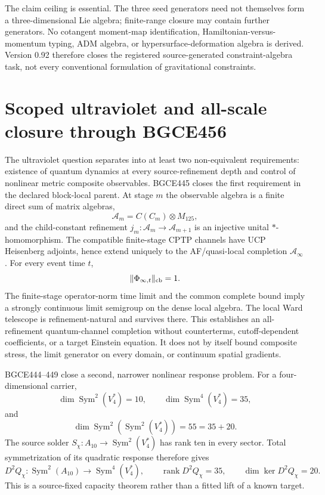 \documentclass[11pt]{article}
\theoremstyle{definition}
\theoremstyle{remark}
\newcommand{\Sym}{\operatorname{Sym}}
\begin{document}
The claim ceiling is essential. The three seed generators need not themselves form a three-dimensional Lie algebra; finite-range closure may contain further generators. No cotangent moment-map identification, Hamiltonian-versus-momentum typing, ADM algebra, or hypersurface-deformation algebra is derived. Version 0.92 therefore closes the registered source-generated constraint-algebra task, not every conventional formulation of gravitational constraints.

\section{Scoped ultraviolet and all-scale closure through BGCE456}\label{sec:uv09}

The ultraviolet question separates into at least two non-equivalent requirements: existence of quantum dynamics at every source-refinement depth and control of nonlinear metric composite observables. BGCE445 closes the first requirement in the declared block-local parent. At stage $m$ the observable algebra is a finite direct sum of matrix algebras,
\begin{equation}
 \mathcal A_m=C(C_m)\otimes M_{125},
\end{equation}
and the child-constant refinement $j_m:\mathcal A_m\to\mathcal A_{m+1}$ is an injective unital $*$-homomorphism. The compatible finite-stage CPTP channels have UCP Heisenberg adjoints, hence extend uniquely to the AF/quasi-local completion $\mathcal A_\infty$. For every event time $t$,
\begin{equation}
 \lVert\Phi_{\infty,t}\rVert_{\rm cb}=1.
\end{equation}
The finite-stage operator-norm time limit and the common complete bound imply a strongly continuous limit semigroup on the dense local algebra. The local Ward telescope is refinement-natural and survives there. This establishes an all-refinement quantum-channel completion without counterterms, cutoff-dependent coefficients, or a target Einstein equation. It does not by itself bound composite stress, the limit generator on every domain, or continuum spatial gradients.

BGCE444--449 close a second, narrower nonlinear response problem. For a four-dimensional carrier,
\begin{equation}
 \dim\Sym^2(V_4^*)=10,
 \qquad
 \dim\Sym^4(V_4^*)=35,
\end{equation}
and
\begin{equation}
 \dim\Sym^2\!\left(\Sym^2(V_4^*)\right)=55=35+20.
\end{equation}
The source solder $S_\chi:A_{10}\to\Sym^2(V_4^*)$ has rank ten in every sector. Total symmetrization of its quadratic response therefore gives
\begin{equation}
 D^2Q_\chi:\Sym^2(A_{10})\longrightarrow\Sym^4(V_4^*),
 \qquad \operatorname{rank}D^2Q_\chi=35,
 \qquad \dim\ker D^2Q_\chi=20.
\end{equation}
This is a source-fixed capacity theorem rather than a fitted lift of a known target.
\end{document}
